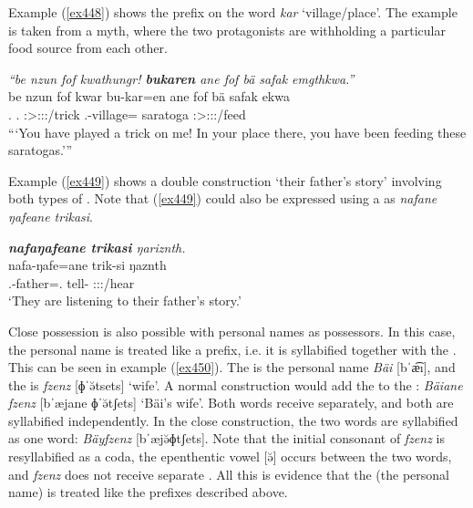 Example (\ref{ex448}) shows the  prefix on the word \emph{kar} `village/place'. The example is taken from a myth, where the two protagonists are withholding a particular food source from each other.

\begin{exe}
	\ex \emph{``be nzun fof kwathungr! \textbf{bukaren} ane fof bä safak emgthkwa.''}\\
	\gll be nzun fof kwar bu-kar=en ane fof bä safak ekwa\\
	\Ssg.\Erg{} \Fsg.\Dat{} \Emph{} \Stsg:\Sbj>\Fsg:\Io:\Rpst:\Ipfv/trick \Ssg.\Poss-village=\Loc{} \Dem{} \Emph{} \Med{} saratoga \Stsg:\Sbj>\Stpl:\Obj:\Pst:\Ipfv/feed\\
	\trans ```You have played a trick on me! In your place there, you have been feeding these saratogas.'''
	\label{ex448}
\end{exe}

Example (\ref{ex449}) shows a double  construction `their father's story' involving both types of . Note that (\ref{ex449}) could also be expressed using a   as \emph{nafane ŋafeane trikasi}.
	
\begin{exe}
	\ex \emph{\textbf{nafaŋafeane trikasi} ŋariznth.}\\
	\gll nafa-ŋafe=ane trik-si ŋaznth\\
	\Third.\Poss-father=\Poss.\Sg{} tell-\Nmlz{} \Stdu:\Sbj:\Nonpast:\Ipfv/hear\\
	\trans `They are listening to their father's story.'
	\label{ex449}
\end{exe}

Close possession is also possible with personal names as possessors. In this case, the personal name is treated like a prefix, i.e. it is syllabified together with the . This can be seen in example (\ref{ex450}). The  is the personal name \emph{Bäi} [bˈæ͡ı], and the  is \emph{fzenz} [ɸˈə̆tsets] `wife'. A normal  construction would add the   to the : \emph{Bäiane fzenz} [bˈæjane ɸˈə̆tʃets] `Bäi's wife'. Both words receive  separately, and both are syllabified independently. In the close  construction, the two words are syllabified as one word: \emph{Bäyfzenz} [bˈæjə̆ɸtʃets]. Note that the initial consonant of \emph{fzenz} is resyllabified as a coda, the epenthentic vowel [ə̆] occurs between the two words, and \emph{fzenz} does not receive separate . All this is evidence that the  (the personal name) is treated like the prefixes described above.


